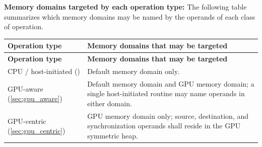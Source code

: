 \textbf{Memory domains targeted by each operation type:} The following table
summarizes which memory domains may be named by the operands of each class of
operation.

\begin{longtable}{|p{4.6cm}|p{9.9cm}|}
\hline
\textbf{Operation type} & \textbf{Memory domains that may be targeted} \\
\hline
\endfirsthead
\hline
\textbf{Operation type} & \textbf{Memory domains that may be targeted} \\
\hline
\endhead
CPU / host-initiated (\openshmem 1.6) & Default memory domain only. \\
\hline
GPU-aware (\cref{sec:gpu_aware}) & Default memory domain and \ac{GPU} memory
domain; a single host-initiated routine may name operands in either domain. \\
\hline
GPU-centric (\cref{sec:gpu_centric}) & \ac{GPU} memory domain only; source,
destination, and synchronization operands shall reside in the \ac{GPU} symmetric
heap. \\
\hline
\end{longtable}

